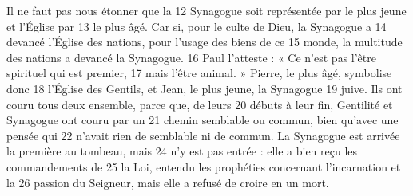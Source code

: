Il ne faut pas nous étonner que la	 
12	 	Synagogue soit représentée par le plus jeune et l'Église par	 
13	 	le plus âgé. Car si, pour le culte de Dieu, la Synagogue a	 
14	 	devancé l'Église des nations, pour l'usage des biens de ce	 
15	 	monde, la multitude des nations a devancé la Synagogue.	 
16	 	Paul l'atteste : « Ce n'est pas l'être spirituel qui est premier,	 
17	 	mais l'être animal. » Pierre, le plus âgé, symbolise donc	 
18	 	l'Église des Gentils, et Jean, le plus jeune, la Synagogue	 
19	 	juive. Ils ont couru tous deux ensemble, parce que, de leurs	 
20	 	débuts à leur fin, Gentilité et Synagogue ont couru par un	 
21	 	chemin semblable ou commun, bien qu'avec une pensée qui	 
22	 	n'avait rien de semblable ni de commun.
La Synagogue est arrivée la première au tombeau, mais	 
24	 	n'y est pas entrée : elle a bien reçu les commandements de	 
25	 	la Loi, entendu les prophéties concernant l'incarnation et la	 
26	 	passion du Seigneur, mais elle a refusé de croire en un mort.